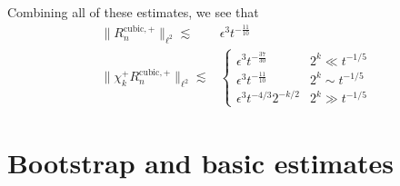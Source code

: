 \documentclass[letterpaper, reqno,final]{amsart}
\begin{document}
Combining all of these estimates, we see that
\begin{equation}\label{eqn:R-cubic-decay-bds}\begin{split}
    \lVert R_n^{\text{cubic},+} \rVert_{\ell^2} \lesssim& \epsilon^3 t^{-\frac{11}{10}}\\
    \lVert \chi_k^+ R_n^{\text{cubic},+} \rVert_{\ell^2} \lesssim& \begin{cases}
        \epsilon^3 t^{-\frac{37}{30}} & 2^k \ll t^{-1/5}\\
        \epsilon^3 t^{-\frac{11}{10}} & 2^k \sim t^{-1/5}\\
        \epsilon^3 t^{-4/3} 2^{-k/2} & 2^k \gg t^{-1/5}
    \end{cases}
\end{split}\end{equation}

\section{Bootstrap and basic estimates\label{sec:prof-red}} 
\end{document}
